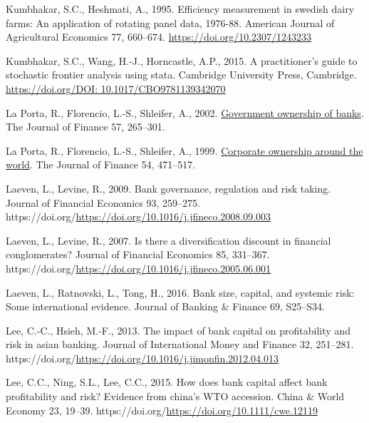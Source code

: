 \documentclass[
  12pt,
  a4paper,
]{scrreprt}
\newlength{\cslhangindent}
\newenvironment{CSLReferences}[2] %
 {\begin{list}{}{%
  \setlength{\itemindent}{0pt}
  \setlength{\leftmargin}{0pt}
  \setlength{\parsep}{0pt}
  \ifodd #1
   \setlength{\leftmargin}{\cslhangindent}
   \setlength{\itemindent}{-1\cslhangindent}
  \fi
  \setlength{\itemsep}{#2\baselineskip}}}
 {\end{list}}
\begin{document}
{{{{\begin{CSLReferences}{1}{0}
Kumbhakar, S.C., Heshmati, A., 1995. Efficiency measurement in swedish
dairy farms: An application of rotating panel data, 1976-88. American
Journal of Agricultural Economics 77, 660--674.
\url{https://doi.org/10.2307/1243233}

Kumbhakar, S.C., Wang, H.-J., Horncastle, A.P., 2015. A practitioner's
guide to stochastic frontier analysis using stata. Cambridge University
Press, Cambridge.
\href{https://doi.org/DOI:\%2010.1017/CBO9781139342070}{https://doi.org/DOI:
10.1017/CBO9781139342070}

La Porta, R., Florencio, L.-S., Shleifer, A., 2002.
\href{http://www.jstor.org.queens.ezp1.qub.ac.uk/stable/2697840}{Government
ownership of banks}. The Journal of Finance 57, 265--301.

La Porta, R., Florencio, L.-S., Shleifer, A., 1999.
\href{http://www.jstor.org.queens.ezp1.qub.ac.uk/stable/2697717}{Corporate
ownership around the world}. The Journal of Finance 54, 471--517.

Laeven, L., Levine, R., 2009. Bank governance, regulation and risk
taking. Journal of Financial Economics 93, 259--275.
https://doi.org/\url{https://doi.org/10.1016/j.jfineco.2008.09.003}

Laeven, L., Levine, R., 2007. Is there a diversification discount in
financial conglomerates? Journal of Financial Economics 85, 331--367.
https://doi.org/\url{https://doi.org/10.1016/j.jfineco.2005.06.001}

Laeven, L., Ratnovski, L., Tong, H., 2016. Bank size, capital, and
systemic risk: Some international evidence. Journal of Banking \&
Finance 69, S25--S34.

Lee, C.-C., Hsieh, M.-F., 2013. The impact of bank capital on
profitability and risk in asian banking. Journal of International Money
and Finance 32, 251--281.
https://doi.org/\url{https://doi.org/10.1016/j.jimonfin.2012.04.013}

Lee, C.C., Ning, S.L., Lee, C.C., 2015. How does bank capital affect
bank profitability and risk? Evidence from china's WTO accession. China
\& World Economy 23, 19--39.
https://doi.org/\url{https://doi.org/10.1111/cwe.12119}


\end{CSLReferences}}}}}
\end{document}
